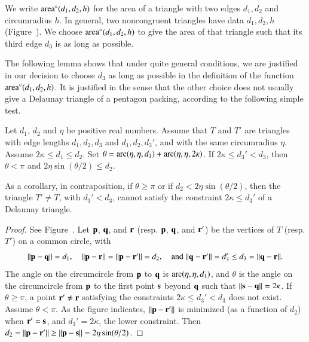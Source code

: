 We write ${\operatorname{area}}^\circ(d_1,d_2,h)$ for the area of a triangle with two edges
$d_1,d_2$ and circumradius $h$.  In general, two noncongruent
triangles have data $d_1,d_2,h$ (Figure~).  We choose ${\operatorname{area}}^\circ(d_1,d_2,h)$ to
give the area of that triangle such that its third edge $d_3$ is as
long as possible.

The following lemma shows that under quite general
conditions, we are justified in our decision to choose $d_3$ as long
as possible in the definition of the function ${\operatorname{area}}^\circ(d_1,d_2,h)$.  It
is justified in the sense that the other choice does not usually give
a Delaunay triangle of a pentagon packing, according to the following
simple test.

\begin{lemma}  
  Let $d_1$, $d_2$ and $\eta$ be positive real numbers.  Assume that
  $T$ and $T'$ are triangles with edge lengths $d_1,d_2,d_3$ and
  $d_1,d_2,d_3'$, and with the same circumradius $\eta$. Assume
  $2\kappa\le d_1\le d_2$.  Set $\theta =
  \operatorname{arc}(\eta,\eta,d_1)+\operatorname{arc}(\eta,\eta,2\kappa)$.  If $2\kappa \le d_3'
  < d_3$, then $\theta < \pi$ and $2\eta\sin(\theta/2) \le d_2$.
\end{lemma}

As a corollary, 
in contraposition, if $\theta\ge\pi$ or if $d_2 < 2\eta\sin(\theta/2)$,
then the triangle $T'\ne T$, with $d_3' < d_3$,
cannot satisfy the constraint $2\kappa\le d_3'$ of a  Delaunay triangle.

\begin{proof} 
  See Figure~.  Let ${\mathbf p}$, ${\mathbf q}$, and ${\mathbf r}$ (resp. ${\mathbf p}$,
  ${\mathbf q}$, and ${\mathbf r}'$) be the vertices of $T$ (resp. $T'$) on a common
  circle, with
\[
\norm{\p}{\q} =d_1, 
\quad\norm{\p}{\r}=\norm{\p}{\r'}=d_2, \quad\text{and } 
\norm{\q}{\r'} = d_3' \le d_3=\norm{\q}{\r}.
\]
The angle on the circumcircle from ${\mathbf p}$ to ${\mathbf q}$ is
$\operatorname{arc}(\eta,\eta,d_1)$, and $\theta$ is the angle on the circumcircle
from ${\mathbf p}$ to the first point ${\mathbf s}$ beyond ${\mathbf q}$ such that
$\norm{\s}{\q}=2\kappa$.  If $\theta\ge\pi$, a point ${\mathbf r}'\ne {\mathbf r}$
satisfying the constraints $2\kappa\le d_3'<d_3$ does not exist.  Assume $\theta < \pi$.  As
the figure indicates, $\norm{\p}{\r'}$ is minimized (as a function of
$d_2$) when ${\mathbf r}'={\mathbf s}$, and $d_3' = 2\kappa$, the lower constraint.
Then $d_2 = \norm{\p}{\r'}\ge \norm{\p}{\s}= 2\eta\sin(\theta/2)$.
\end{proof}


